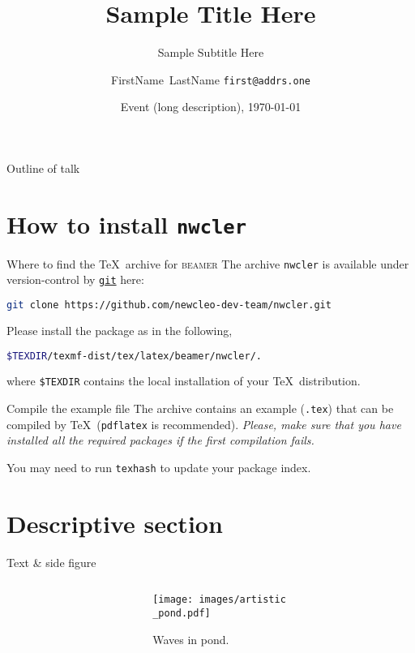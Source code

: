 \documentclass[aspectratio=169,11pt]{beamer}
\title{Sample Title Here}
\subtitle{Sample Subtitle Here}
\date[Event-short-name]{Event (long description), \today}
\author[authors-in-short]{
  FirstName~LastName\inst{1} \texttt{first@addrs.one}
}
\institute[NWCL]{
  \inst{1} \newcleo\ SpA, Via Giuseppe Galliano 27, 10129 Torino, Italy
}
\newcommand{\examplefile}{\jobname.tex}
\begin{document}
\begin{frame}
  \titlepage
\end{frame}

\begin{frame}{Outline of talk}
  \tableofcontents
\end{frame}

\section{How to install \texttt{nwcler}}

\begin{frame}[fragile]{\secname}
\begin{block}{Where to find the \TeX\ archive for \textsc{beamer}}
  \small
  The archive \texttt{nwcler} is available under version-control by
  \href{https://git-scm.com/}{\texttt{git}} here:
  \begin{lstlisting}[language=bash]
    git clone https://github.com/newcleo-dev-team/nwcler.git
  \end{lstlisting}
  Please install the package as in the following,
  \begin{lstlisting}[language=bash]
  $TEXDIR/texmf-dist/tex/latex/beamer/nwcler/.
  \end{lstlisting}
  where \lstinline|$TEXDIR| contains the local installation of your
  \TeX\ distribution.
\end{block}
\begin{exampleblock}{Compile the example file}
  \small
  The archive contains an example (\texttt{\examplefile})
  that can be compiled by \TeX\ (\texttt{pdflatex} is recommended).
  \emph{Please, make sure that you have installed all the required
  packages if the first compilation fails.}
\end{exampleblock}
\begin{center}
\alert<2>{You may need to run \texttt{texhash} to update your
package index.}
\end{center}
\end{frame}

\section{Descriptive section}

\begin{frame}{Text \& side figure}

\begin{columns}
\begin{column}{0.58\textwidth}
  \scriptsize
  \lipsum[1]
\end{column}
\hfill
\begin{column}{0.4\textwidth}
  \begin{figure}
    \centering
    \texttt{[image: images/artistic\\\_pond.pdf]}
    \caption{Waves in pond.}
    \label{fig:artpond}
  \end{figure}
\end{column}
\end{columns}
\end{frame}
\end{document}
